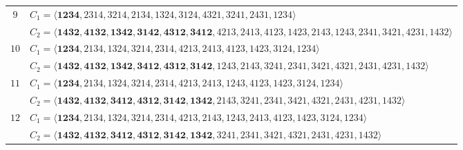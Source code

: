 \documentclass[12pt,a4paper]{amsart}
\theoremstyle{definition}
\begin{document}
\begin{table}[htbp]
\begin{adjustbox}{angle=90,max height=\textheight}
\begin{minipage}{\textheight}
\begin{tabular}{@{}c l@{}}
$9$ &
$C_1=\langle\mathbf{1234},2314,3214,2134,1324,3124,4321,3241,2431,1234\rangle$\\
&
$C_2=\langle\mathbf{1432,4132,1342,3142,4312,3412},4213,2413,4123,1423,2143,1243,2341,3421,4231,1432\rangle$
\\
\midrule

$10$ &
$C_1=\langle\mathbf{1234},2134,1324,3214,2314,4213,2413,4123,1423,3124,1234\rangle$\\
&
$C_2=\langle\mathbf{1432,4132,1342,3412,4312,3142},1243,2143,3241,2341,3421,4321,2431,4231,1432\rangle$
\\
\midrule

$11$ &
$C_1=\langle\mathbf{1234},2134,1324,3214,2314,4213,2413,1243,4123,1423,3124,1234\rangle$\\
&
$C_2=\langle\mathbf{1432,4132,3412,4312,3142,1342},2143,3241,2341,3421,4321,2431,4231,1432\rangle$
\\
\midrule

$12$ &
$C_1=\langle\mathbf{1234},2134,1324,3214,2314,4213,2143,1243,2413,4123,1423,3124,1234\rangle$\\
&
$C_2=\langle\mathbf{1432,4132,3412,4312,3142,1342},3241,2341,3421,4321,2431,4231,1432\rangle$
\\

\bottomrule
\end{tabular}

\end{minipage} %
\end{adjustbox}
\end{table}

	
\end{document}
